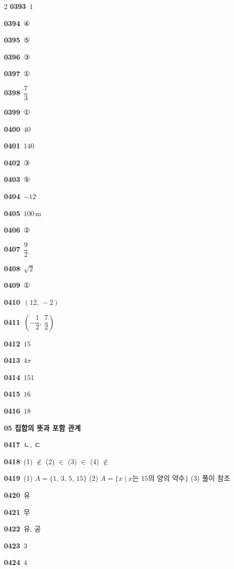 \documentclass[10pt,a4paper]{article}
\begin{document}
\begin{multicols}{2}
\noindent\textbf{0393}\ $1$\par
\noindent\textbf{0394}\ ④\par
\noindent\textbf{0395}\ ⑤\par
\noindent\textbf{0396}\ ③\par
\noindent\textbf{0397}\ ①\par
\noindent\textbf{0398}\ $\dfrac{7}{3}$\par
\noindent\textbf{0399}\ ①\par
\noindent\textbf{0400}\ $40$\par
\noindent\textbf{0401}\ $140$\par
\noindent\textbf{0402}\ ③\par
\noindent\textbf{0403}\ ⑤\par
\noindent\textbf{0404}\ $-12$\par
\noindent\textbf{0405}\ $100\,\mathrm{m}$\par
\noindent\textbf{0406}\ ②\par
\noindent\textbf{0407}\ $\dfrac{9}{2}$\par
\noindent\textbf{0408}\ $\sqrt{2}$\par
\noindent\textbf{0409}\ ①\par
\noindent\textbf{0410}\ $(12,\,-2)$\par
\noindent\textbf{0411}\ $\left(-\dfrac{1}{2},\,\dfrac{7}{2}\right)$\par
\noindent\textbf{0412}\ $15$\par
\noindent\textbf{0413}\ $4\pi$\par
\noindent\textbf{0414}\ $151$\par
\noindent\textbf{0415}\ $16$\par
\noindent\textbf{0416}\ $18$\par
\noindent\textbf{05 집합의 뜻과 포함 관계}\par\smallskip
\noindent\textbf{0417}\ ㄴ, ㄷ\par
\noindent\textbf{0418}\ (1) $\notin$ (2) $\in$ (3) $\in$ (4) $\notin$\par
\noindent\textbf{0419}\ (1) $A=\{1,\,3,\,5,\,15\}$ (2) $A=\{x \mid x$는 $15$의 양의 약수$\}$ (3) 풀이 참조\par
\noindent\textbf{0420}\ 유\par
\noindent\textbf{0421}\ 무\par
\noindent\textbf{0422}\ 유, 공\par
\noindent\textbf{0423}\ $3$\par
\noindent\textbf{0424}\ $4$\par

\end{multicols}
\end{document}
